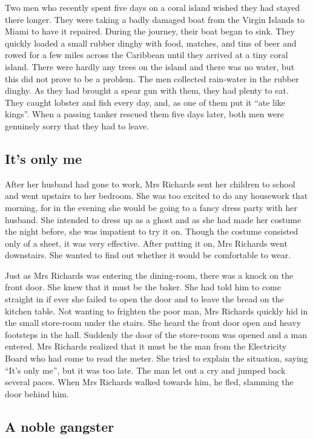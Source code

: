 \documentclass[11pt]{article}
\begin{document}
Two men who recently spent five days on a coral island wished they had stayed there longer. They were taking a badly damaged boat from the Virgin Islands to Miami to have it repaired. During the journey, their boat began to sink. They quickly loaded a small rubber dinghy with food, matches, and tins of beer and rowed for a few miles across the Caribbean until they arrived at a tiny coral island. There were hardly any trees on the island and there was no water, but this did not prove to be a problem. The men collected rain-water in the rubber dinghy. As they had brought a spear gun with them, they had plenty to eat. They caught lobster and fish every day, and, as one of them put it ``ate like kings''. When a passing tanker rescued them five days later, both men were genuinely sorry that they had to leave. 
\subsection{It's only me}
\label{sec-1-13}

After her husband had gone to work, Mrs Richards sent her children to school and went upstairs to her bedroom. She was too excited to do any housework that morning, for in the evening she would be going to a fancy dress party with her husband. She intended to dress up as a ghost and as she had made her costume the night before, she was impatient to try it on. Though the costume consisted only of a sheet, it was very effective. After putting it on, Mrs Richards went downstairs. She wanted to find out whether it would be comfortable to wear. 

Just as Mrs Richards was entering the dining-room, there was a knock on the front door. She knew that it must be the baker. She had told him to come straight in if ever she failed to open the door and to leave the bread on the kitchen table. Not wanting to frighten the poor man, Mrs Richards quickly hid in the small store-room under the stairs. She heard the front door open and heavy footsteps in the hall. Suddenly the door of the store-room was opened and a man entered. Mrs Richards realized that it must be the man from the Electricity Board who had come to read the meter. She tried to explain the situation, saying ``It's only me'', but it was too late. The man let out a cry and jumped back several paces. When Mrs Richards walked towards him, he fled, slamming the door behind him.
\subsection{A noble gangster}
\label{sec-1-14}
\end{document}
